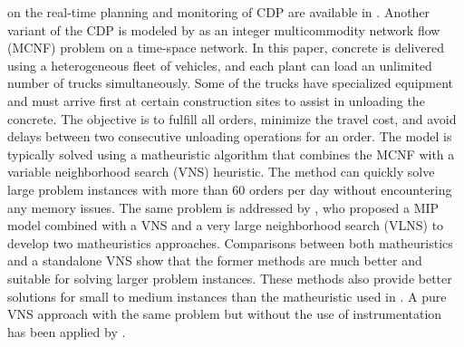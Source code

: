 on the real-time planning and monitoring of CDP are available in \cite{garza2021dynamic}. Another variant of the CDP is modeled by \cite{schmid2009hybrid} as an integer multicommodity network flow (MCNF) problem on a time-space network. In this paper, concrete is delivered using a heterogeneous fleet of vehicles, and each plant can load an unlimited number of trucks simultaneously. Some of the trucks have specialized equipment and must arrive first at certain construction sites to assist in unloading the concrete. The objective is to fulfill all orders, minimize the travel cost, and avoid delays between two consecutive unloading operations for an order. The model is typically solved using a matheuristic algorithm that combines the MCNF with a variable neighborhood search (VNS) heuristic. The method can quickly solve large problem instances with more than 60 orders per day without encountering any memory issues. The same problem is addressed by \cite{schmid2010hybridization}, who proposed a MIP model combined with a VNS and a very large neighborhood search (VLNS) to develop two matheuristics approaches. Comparisons between both matheuristics and a standalone VNS show that the former methods are much better and suitable for solving larger problem instances. These methods also provide better solutions for small to medium instances than the matheuristic used in \cite{schmid2009hybrid}. A pure VNS approach with the same problem but without the use of instrumentation has been applied by \cite{payr2009optimizing}.

